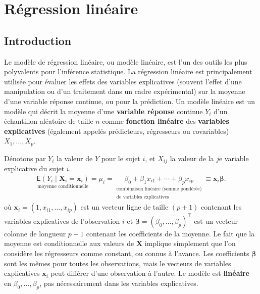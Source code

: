 \documentclass[
  11pt,
  letterpaper,
]{scrbook}
\theoremstyle{definition}
\theoremstyle{plain}
\theoremstyle{definition}
\theoremstyle{plain}
\theoremstyle{remark}
\begin{document}
\chapter{Régression linéaire}\label{regression-lineaire}

\section{Introduction}\label{introduction}

Le modèle de régression linéaire, ou modèle linéaire, est l'un des
outils les plus polyvalents pour l'inférence statistique. La régression
linéaire est principalement utilisée pour évaluer les effets des
variables explicatives (souvent l'effet d'une manipulation ou d'un
traitement dans un cadre expérimental) sur la moyenne d'une variable
réponse continue, ou pour la prédiction. Un modèle linéaire est un
modèle qui décrit la moyenne d'une \textbf{variable réponse} continue
\(Y_i\) d'un échantillon aléatoire de taille \(n\) comme
\textbf{fonction linéaire} des \textbf{variables explicatives}
(également appelés prédicteurs, régresseurs ou covariables)
\(X_1, \ldots, X_p\).

Dénotons par \(Y_i\) la valeur de \(Y\) pour le sujet \(i\), et
\(X_{ij}\) la valeur de la \(j\)e variable explicative du sujet \(i\).
\begin{align}
\underset{\text{moyenne conditionnelle}}{\mathsf{E}(Y_i \mid \boldsymbol{X}_i=\boldsymbol{x}_i)}=\mu_i=\underset{\substack{\text{combinaison linéaire (somme pondérée)}\\ \text{de variables explicatives}}}{\beta_0 + \beta_1x_{i1} + \cdots + \beta_p x_{ip}}\equiv \mathbf{x}_i\boldsymbol{\beta}.
\end{align} où \(\mathbf{x}_i = (1, x_{i1}, \ldots, x_{ip})\) est un
vecteur ligne de taille \((p+1)\) contenant les variables explicatives
de l'observation \(i\) et
\(\boldsymbol{\beta} = (\beta_0, \ldots, \beta_p)^\top\) est un vecteur
colonne de longueur \(p+1\) contenant les coefficients de la moyenne. Le
fait que la moyenne est conditionnelle aux valeurs de \(\mathbf{X}\)
implique simplement que l'on considère les régresseurs comme constant,
ou connus à l'avance. Les coefficients \(\boldsymbol{\beta}\) sont les
mêmes pour toutes les observations, mais le vecteurs de variables
explicatives \(\mathbf{x}_i\) peut différer d'une observation à l'autre.
Le modèle est \textbf{linéaire} en \(\beta_0, \ldots, \beta_p\), pas
nécessairement dans les variables explicatives.
\end{document}
